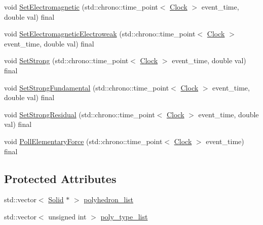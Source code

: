 \begin{DoxyCompactItemize}
void \mbox{\hyperlink{classSolid_a9a660f9d94f597712c67922aa1d4d795}{Set\+Electromagnetic}} (std\+::chrono\+::time\+\_\+point$<$ \mbox{\hyperlink{universe_8h_a0ef8d951d1ca5ab3cfaf7ab4c7a6fd80}{Clock}} $>$ event\+\_\+time, double val) final
\item 
void \mbox{\hyperlink{classSolid_a6617ae9fe4707d760a23b54eddf00dec}{Set\+Electromagnetic\+Electroweak}} (std\+::chrono\+::time\+\_\+point$<$ \mbox{\hyperlink{universe_8h_a0ef8d951d1ca5ab3cfaf7ab4c7a6fd80}{Clock}} $>$ event\+\_\+time, double val) final
\item 
void \mbox{\hyperlink{classSolid_a478e15cdf15c5bb01cbcbd5f584ef83a}{Set\+Strong}} (std\+::chrono\+::time\+\_\+point$<$ \mbox{\hyperlink{universe_8h_a0ef8d951d1ca5ab3cfaf7ab4c7a6fd80}{Clock}} $>$ event\+\_\+time, double val) final
\item 
void \mbox{\hyperlink{classSolid_a4342786a7785b1a3816d20de02105bcf}{Set\+Strong\+Fundamental}} (std\+::chrono\+::time\+\_\+point$<$ \mbox{\hyperlink{universe_8h_a0ef8d951d1ca5ab3cfaf7ab4c7a6fd80}{Clock}} $>$ event\+\_\+time, double val) final
\item 
void \mbox{\hyperlink{classSolid_a8b80ebe209fcd3afa4791968127753d0}{Set\+Strong\+Residual}} (std\+::chrono\+::time\+\_\+point$<$ \mbox{\hyperlink{universe_8h_a0ef8d951d1ca5ab3cfaf7ab4c7a6fd80}{Clock}} $>$ event\+\_\+time, double val) final
\item 
void \mbox{\hyperlink{classSolid_ae2a486e59f11f96a1a39756b3f3da53f}{Poll\+Elementary\+Force}} (std\+::chrono\+::time\+\_\+point$<$ \mbox{\hyperlink{universe_8h_a0ef8d951d1ca5ab3cfaf7ab4c7a6fd80}{Clock}} $>$ event\+\_\+time) final
\end{DoxyCompactItemize}
\subsection*{Protected Attributes}
\begin{DoxyCompactItemize}
\item 
std\+::vector$<$ \mbox{\hyperlink{classSolid}{Solid}} $\ast$ $>$ \mbox{\hyperlink{classSolid_a67ef5cdd87e5629159660fa9bb5833c8}{polyhedron\+\_\+list}}
\item 
std\+::vector$<$ unsigned int $>$ \mbox{\hyperlink{classSolid_ad63206ff20f38b621db482b01801c4c5}{poly\+\_\+type\+\_\+list}}
\end{DoxyCompactItemize}
